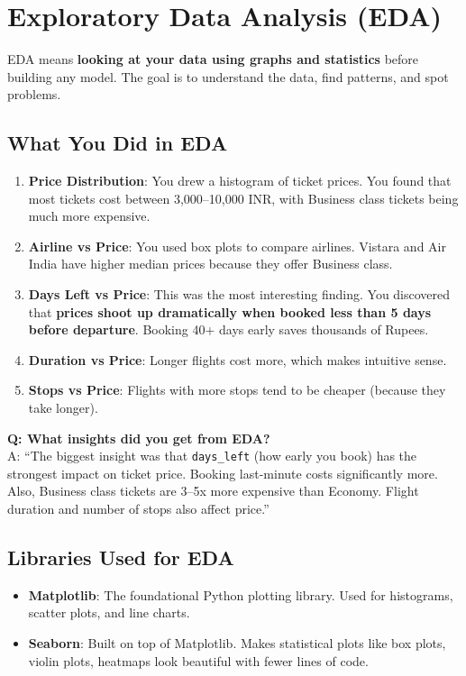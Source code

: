 \documentclass[12pt, a4paper]{article}
\begin{document}
\section{Exploratory Data Analysis (EDA)}

\begin{conceptbox}
    EDA means \textbf{looking at your data using graphs and statistics} before building any model. The goal is to understand the data, find patterns, and spot problems.
\end{conceptbox}

\subsection{What You Did in EDA}
\begin{enumerate}
    \item \textbf{Price Distribution}: You drew a histogram of ticket prices. You found that most tickets cost between 3,000--10,000 INR, with Business class tickets being much more expensive.
    \item \textbf{Airline vs Price}: You used box plots to compare airlines. Vistara and Air India have higher median prices because they offer Business class.
    \item \textbf{Days Left vs Price}: This was the most interesting finding. You discovered that \textbf{prices shoot up dramatically when booked less than 5 days before departure}. Booking 40+ days early saves thousands of Rupees.
    \item \textbf{Duration vs Price}: Longer flights cost more, which makes intuitive sense.
    \item \textbf{Stops vs Price}: Flights with more stops tend to be cheaper (because they take longer).
\end{enumerate}

\begin{warnbox}
    \textbf{Q: What insights did you get from EDA?} \\
    A: ``The biggest insight was that \texttt{days\_left} (how early you book) has the strongest impact on ticket price. Booking last-minute costs significantly more. Also, Business class tickets are 3--5x more expensive than Economy. Flight duration and number of stops also affect price.''
\end{warnbox}

\subsection{Libraries Used for EDA}
\begin{itemize}
    \item \textbf{Matplotlib}: The foundational Python plotting library. Used for histograms, scatter plots, and line charts.
    \item \textbf{Seaborn}: Built on top of Matplotlib. Makes statistical plots like box plots, violin plots, heatmaps look beautiful with fewer lines of code.
\end{itemize}
\end{document}
